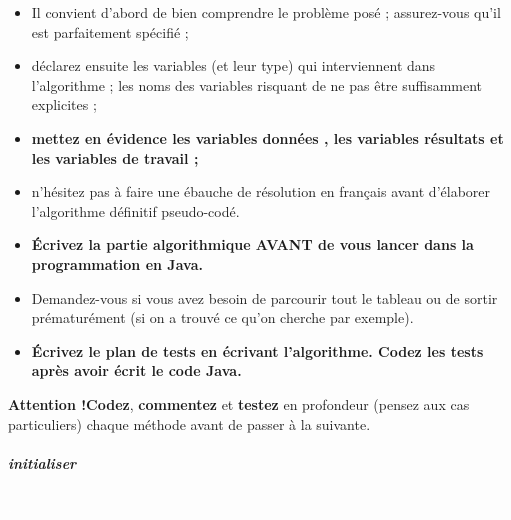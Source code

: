 \documentclass[11pt,a4paper]{article}
\begin{document}
					\begin{itemize}
				
			\item Il convient d'abord de bien comprendre le probl\`eme pos\'e ; assurez-vous qu'il est parfaitement sp\'ecifi\'e ;
			\item d\'eclarez ensuite les variables (et leur type) qui interviennent dans l'algorithme ; les noms des variables risquant de ne pas \^etre suffisamment explicites ;
			\item \textbf{mettez en \'evidence les variables \guillemotleft  donn\'ees \guillemotright , les variables \guillemotleft  r\'esultats \guillemotright  et les variables de travail ;}
			\item n'h\'esitez pas \`a faire une \'ebauche de r\'esolution en fran\c cais avant d'\'elaborer l'algorithme d\'efinitif pseudo-cod\'e.
			\item \textbf{\'Ecrivez la partie algorithmique AVANT de vous lancer dans la programmation en Java.}
			\item Demandez-vous si vous avez besoin de parcourir tout le tableau ou de sortir pr\'ematur\'ement (si on a trouv\'e ce qu'on cherche par exemple).
			\item \textbf{\'Ecrivez le plan de tests en \'ecrivant l'algorithme. Codez les tests apr\`es avoir \'ecrit le code Java.}
					\end{itemize}
				
            \par
        \textbf{Attention !}\textbf{Codez}, \textbf{commentez} 
					et \textbf{testez} en profondeur
					(pensez aux cas particuliers)
					chaque m\'ethode avant de passer \`a la suivante.
				
            \par
        
			
		\subparagraph{initialiser} 
		
					\textcolor{white}{.} \par
				
            \par
        
\end{document}
